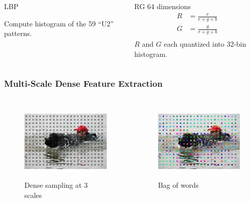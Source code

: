 \documentclass{beamer}
\begin{document}
\begin{frame}
\begin{columns}
\begin{column}{.3\textwidth}
\begin{block}{LBP}
\begin{figure}
\end{figure}
Compute histogram of the 59 ``U2'' patterns.
\end{block}
\end{column}
\pause
\begin{column}{.3\textwidth}
\begin{block}{RG}
64 dimensions
\begin{equation}
\begin{split}
R &= \frac{r}{r+g+b} \\
G &= \frac{g}{r+g+b} \\
\end{split}
\end{equation}
$R$ and $G$ each quantized into 32-bin histogram.
\end{block}
\end{column}
\end{columns}
\end{frame}

\begin{frame}
\frametitle{Multi-Scale Dense Feature Extraction}
\begin{columns}
\begin{column}{.5\textwidth}
\begin{figure}
\includegraphics[height=1.5in]{dog_intdet}
\caption{Dense sampling at 3 scales}
\end{figure}
\end{column}
\pause
\begin{column}{.5\textwidth}
\begin{figure}
\includegraphics[height=1.5in]{dog_quantized}
\caption{Bag of words}
\end{figure}
\end{column}
\end{columns}
\end{frame}
%
\end{document}
